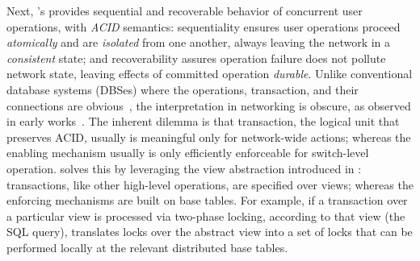 Next, \Sys's \TR provides sequential and recoverable behavior of
concurrent user operations, with \textit{ACID} semantics:
sequentiality ensures user operations proceed \textit{atomically} and
are \textit{isolated} from one another, always leaving the network in
a \textit{consistent} state; and recoverability assures operation
failure does not pollute network state, leaving effects of committed
operation \textit{durable}. Unlike conventional database systems
(DBSes) where the operations, transaction, and their connections are
obvious~\cite{Bernstein:concurrency-recovery,concurrency-recovery-alg,principles-tp,concurrency-ddb},
the interpretation in networking is obscure, as observed in early
works~\cite{hotsdn-transactional-networking,On-Consistent-Updates,of-cpp}.
The inherent dilemma is that transaction, the logical unit that
preserves ACID, usually is meaningful only for network-wide actions;
whereas the enabling mechanism usually is only efficiently enforceable
for switch-level operation. \TTR solves this by leveraging the view
abstraction introduced in \TI: transactions, like other high-level
operations, are specified over views; whereas the enforcing mechanisms
are built on base tables.
For example, if a transaction over a particular view is processed via
two-phase locking, according to that view (the SQL query), \Sys
translates locks over the abstract view into a set of locks that can
be performed locally at the relevant distributed base tables.



